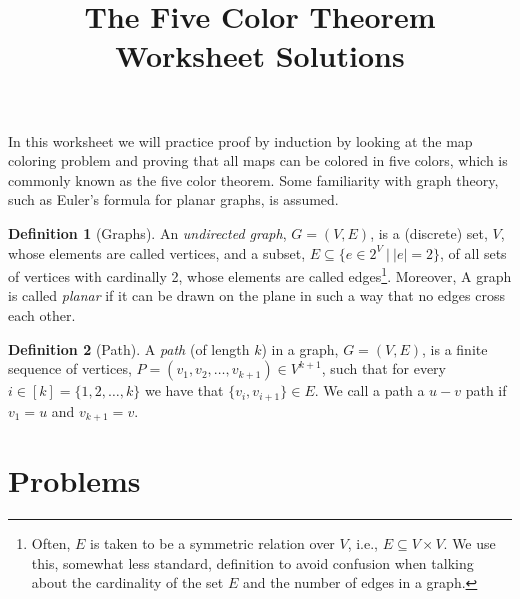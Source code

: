 \documentclass{article}
\title{The Five Color Theorem Worksheet Solutions}}{%
\title{The Five Color Theorem Worksheet}}
\author{}
\date{}
\theoremstyle{plain}
\theoremstyle{definition}
\newtheorem{definition}{Definition}
\begin{document}
\maketitle

\vspace{-0.5in}

In this worksheet we will practice proof by induction by looking at the map coloring problem and proving that all maps can be colored in five colors, which is commonly known as the five color theorem. Some familiarity with graph theory, such as Euler's formula for planar graphs, is assumed. 

\begin{definition}[Graphs]
    An \emph{undirected graph}, \(G = (V, E)\), is a (discrete) set, \(V\), whose elements are called vertices, and a subset, \(E \subseteq \{e \in 2^{V}\ |\ |e| = 2\}\), of all sets of vertices with cardinally 2, whose elements are called edges\footnote{Often, \(E\) is taken to be a symmetric relation over \(V\), i.e., \(E \subseteq V \times V\). We use this, somewhat less standard, definition to avoid confusion when talking about the cardinality of the set \(E\) and the number of edges in a graph.}. Moreover, A graph is called \emph{planar} if it can be drawn on the plane in such a way that no edges cross each other.
\end{definition}

\begin{definition}[Path]
    A \emph{path} (of length \(k\)) in a graph, \(G = (V, E)\), is a finite sequence of vertices, \(P = (v_1, v_2, \dotsc, v_{k+1}) \in V^{k+1}\), such that for every \(i \in [k] = \{1, 2, \dotsc, k\}\) we have that \(\{v_i, v_{i+1}\} \in E\). We call a path a \(u-v\) path if \(v_1 = u\) and \(v_{k+1} = v\).
\end{definition}


\section*{Problems}
\end{document}
